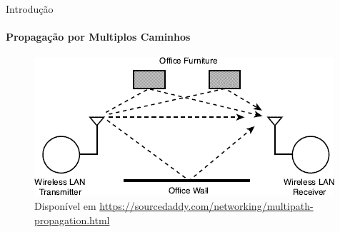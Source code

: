 \documentclass[c]{beamer}
\begin{document}
\begin{darkframes}
  \begin{frame}{Introdução}
    \framesubtitle{Propagação por Multiplos Caminhos}
    \begin{figure}[ht]
      \centering
      \includegraphics[width=\textwidth]{resources/multipath.png}\\
      \footnotesize{Disponível em  \url{https://sourcedaddy.com/networking/multipath-propagation.html}}
    \end{figure}
  \end{frame}



\end{darkframes}
\end{document}
